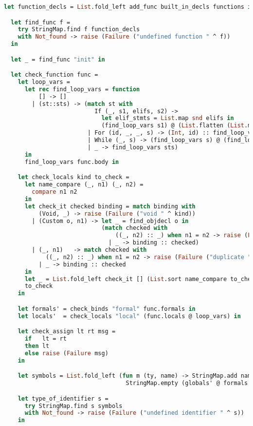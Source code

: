 \begin{lstlisting}[language=Caml,backgroundcolor=\color{backgroundcolor}]
  let function_decls = List.fold_left add_func built_in_decls functions in

  let find_func f =
    try StringMap.find f function_decls
    with Not_found -> raise (Failure ("undefined function " ^ f))
  in

  let _ = find_func "init" in

  let check_function func =
    let loop_vars =
      let rec find_loop_vars = function
          [] -> []
        | (st::sts) -> (match st with
                          If (_, s1, elifs, s2) ->
                            let elif_stmts = List.map snd elifs in
                            (find_loop_vars s1) @ (List.flatten (List.map find_loop_vars elif_stmts)) @ (find_loop_vars s2) @ (find_loop_vars sts)
                        | For (id, _, _, s) -> (Int, id) :: find_loop_vars s
                        | While (_, s) -> (find_loop_vars s) @ (find_loop_vars sts)
                        | _ -> find_loop_vars sts)
      in
      find_loop_vars func.body in

    let check_locals kind to_check =
      let name_compare (_, n1) (_, n2) =
        compare n1 n2
      in
      let check_it checked binding = match binding with
          (Void, _) -> raise (Failure ("void " ^ kind))
        | (Custom o, n1) -> let _ = find_objdecl o in
                            (match checked with
                                ((_, n2) :: _) when n1 = n2 -> raise (Failure ("duplicate " ^ kind))
                              | _ -> binding :: checked)
        | (_, n1)   -> match checked with
            ((_, n2) :: _) when n1 = n2 -> raise (Failure ("duplicate " ^ kind))
          | _ -> binding :: checked
      in
      let _ = List.fold_left check_it [] (List.sort name_compare to_check) in
      to_check
    in

    let formals' = check_binds "formal" func.formals in
    let locals'  = check_locals "local" (func.locals @ loop_vars) in

    let check_assign lt rt msg =
      if   lt = rt
      then lt
      else raise (Failure msg)
    in

    let symbols = List.fold_left (fun m (ty, name) -> StringMap.add name ty m)
	                               StringMap.empty (globals' @ formals' @ locals') in

    let type_of_identifier s =
      try StringMap.find s symbols
      with Not_found -> raise (Failure ("undefined identifier " ^ s))
    in


\end{lstlisting}
